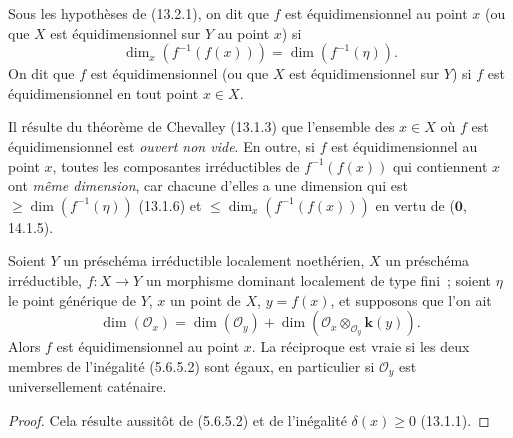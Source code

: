 \begin{definition}[13.2.2]
\label{IV.13.2.2-fr}
Sous les hypothèses de \textup{(13.2.1)}, on dit que $f$ est \textup{équidimensionnel au point}
$x$ (ou que $X$ est \textup{équidimensionnel sur $Y$ au point} $x$) si
\[
  \dim_x(f^{-1}(f(x)))=\dim(f^{-1}(\eta)).
\]
On dit que $f$ est \textup{équidimensionnel} (ou que $X$ est \textup{équidimensionnel sur $Y$})
si $f$ est équidimensionnel en tout point $x\in X$.
\end{definition}

Il résulte du théorème de Chevalley (13.1.3) que l'ensemble des $x\in X$ où
$f$ est équidimensionnel est \emph{ouvert non vide}. En outre, si $f$ est
équidimensionnel au point $x$, toutes les composantes irréductibles de
$f^{-1}(f(x))$ qui contiennent $x$ ont \emph{même dimension}, car chacune
d'elles a une dimension qui est $\geq\dim(f^{-1}(\eta))$ (13.1.6) et
$\leq\dim_x(f^{-1}(f(x)))$ en vertu de ($\mathbf 0$, 14.1.5).

\begin{proposition}[13.2.3]
\label{IV.13.2.3-fr}
Soient $Y$ un préschéma irréductible localement noethérien, $X$ un préschéma
irréductible, $f:X\to Y$ un morphisme \textup{dominant} localement de type fini~;
soient $\eta$ le point générique de $Y$, $x$ un point de $X$, $y=f(x)$, et
supposons que l'on ait
\[
\tag{13.2.3.1}
\label{IV.13.2.3.1-fr}
  \dim(\mathcal O_x)=\dim(\mathcal O_y)
  +\dim(\mathcal O_x\otimes_{\mathcal O_y}\boldsymbol{k}(y)).
\]
Alors $f$ est équidimensionnel au point $x$. La réciproque est vraie si les
deux membres de l'inégalité \textup{(5.6.5.2)} sont égaux, en particulier si
$\mathcal O_y$ est universellement caténaire.
\end{proposition}

\begin{proof}
Cela résulte aussitôt de (5.6.5.2) et de l'inégalité $\delta(x)\geq0$
(13.1.1).
\end{proof}

